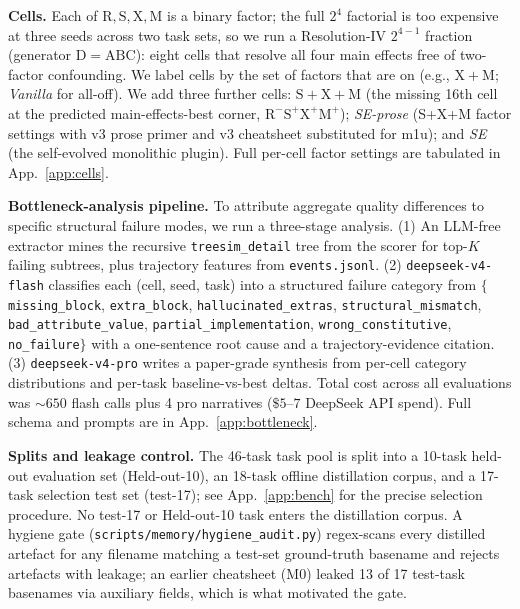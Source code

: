 \documentclass{article}
\begin{document}
\textbf{Cells.} Each of $\mathrm{R, S, X, M}$ is a binary factor; the full $2^4$ factorial is too expensive at three seeds across two task sets, so we run a Resolution-IV $2^{4-1}$ fraction (generator $\mathrm{D}{=}\mathrm{ABC}$): eight cells that resolve all four main effects free of two-factor confounding. We label cells by the set of factors that are on (e.g., $\mathrm{X+M}$; \emph{Vanilla} for all-off). We add three further cells: $\mathrm{S+X+M}$ (the missing 16th cell at the predicted main-effects-best corner, $\mathrm{R}^{-}\mathrm{S}^{+}\mathrm{X}^{+}\mathrm{M}^{+}$); \emph{SE-prose} (S+X+M factor settings with v3 prose primer and v3 cheatsheet substituted for m1u); and \emph{SE} (the self-evolved monolithic plugin). Full per-cell factor settings are tabulated in App.~\ref{app:cells}.

\textbf{Bottleneck-analysis pipeline.} To attribute aggregate quality differences to specific structural failure modes, we run a three-stage analysis. (1) An LLM-free extractor mines the recursive \texttt{treesim\_detail} tree from the scorer for top-$K$ failing subtrees, plus trajectory features from \texttt{events.jsonl}. (2) \texttt{deepseek-v4-flash} classifies each (cell, seed, task) into a structured failure category from $\{$\texttt{missing\_block}, \texttt{extra\_block}, \texttt{hallucinated\_extras}, \texttt{structural\_mismatch}, \texttt{bad\_attribute\_value}, \texttt{partial\_implementation}, \texttt{wrong\_constitutive}, \texttt{no\_failure}$\}$ with a one-sentence root cause and a trajectory-evidence citation. (3) \texttt{deepseek-v4-pro} writes a paper-grade synthesis from per-cell category distributions and per-task baseline-vs-best deltas. Total cost across all evaluations was ${\sim}650$ flash calls plus 4 pro narratives ($\$5\text{--}7$ DeepSeek API spend). Full schema and prompts are in App.~\ref{app:bottleneck}.

\textbf{Splits and leakage control.} The 46-task task pool is split into a 10-task held-out evaluation set (Held-out-10), an 18-task offline distillation corpus, and a 17-task selection test set (test-17); see App.~\ref{app:bench} for the precise selection procedure. No test-17 or Held-out-10 task enters the distillation corpus. A hygiene gate (\texttt{scripts/memory/hygiene\_audit.py}) regex-scans every distilled artefact for any filename matching a test-set ground-truth basename and rejects artefacts with leakage; an earlier cheatsheet (M0) leaked 13 of 17 test-task basenames via auxiliary fields, which is what motivated the gate.
\end{document}

